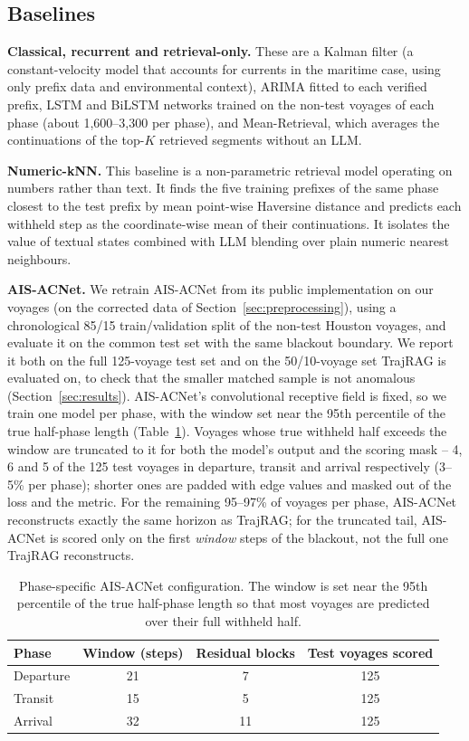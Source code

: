 \subsection{Baselines}
\label{sec:baselines}

\textbf{Classical, recurrent and retrieval-only.} These are a Kalman filter
(a constant-velocity model that accounts for currents in the maritime case,
using only prefix data and environmental context), ARIMA fitted to each
verified prefix, LSTM and BiLSTM networks trained on the non-test voyages of
each phase (about 1,600--3,300 per phase), and Mean-Retrieval, which
averages the continuations of the top-$K$ retrieved segments without an
LLM.

\textbf{Numeric-kNN.} This baseline is a non-parametric retrieval model
operating on numbers rather than text. It finds the five training prefixes
of the same phase closest to the test prefix by mean point-wise Haversine
distance and predicts each withheld step as the coordinate-wise mean of
their continuations. It isolates the value of textual states combined with
LLM blending over plain numeric nearest neighbours.

\textbf{AIS-ACNet.} We retrain AIS-ACNet \citep{shin2024aisacnet} from its
public implementation on our voyages (on the corrected data of
Section~\ref{sec:preprocessing}), using a chronological 85/15
train/validation split of the non-test Houston voyages, and evaluate it on
the common test set with the same blackout boundary. We report it both on
the full 125-voyage test set and on the 50/10-voyage set TrajRAG is
evaluated on, to check that the smaller matched sample is not anomalous
(Section~\ref{sec:results}). AIS-ACNet's
convolutional receptive field is fixed, so we train one model per phase,
with the window set near the 95th percentile of the true half-phase length
(Table~\ref{tab:acnet-config}). Voyages whose true withheld half exceeds the
window are truncated to it for both the model's output and the scoring mask
-- 4, 6 and 5 of the 125 test voyages in departure, transit and arrival
respectively (3--5\% per phase); shorter ones are padded with edge values
and masked out of the loss and the metric. For the remaining 95--97\% of
voyages per phase, AIS-ACNet reconstructs exactly the same horizon as
TrajRAG; for the truncated tail, AIS-ACNet is scored only on the first
\emph{window} steps of the blackout, not the full one TrajRAG reconstructs.

\begin{table}[t]
\centering
\caption{Phase-specific AIS-ACNet configuration. The window is set near the
95th percentile of the true half-phase length so that most voyages are
predicted over their full withheld half.}
\label{tab:acnet-config}
\footnotesize
\begin{tabular}{lccc}
\toprule
Phase & Window (steps) & Residual blocks & Test voyages scored \\
\midrule
Departure & 21 & 7 & 125 \\
Transit & 15 & 5 & 125 \\
Arrival & 32 & 11 & 125 \\
\bottomrule
\end{tabular}
\end{table}

